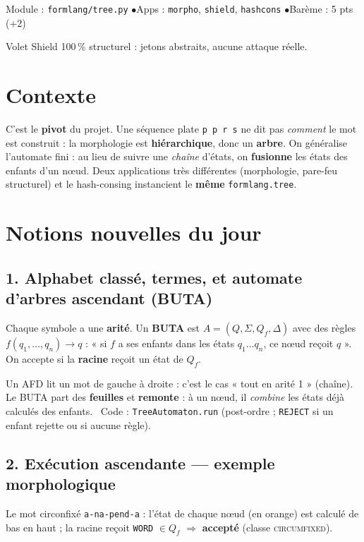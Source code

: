 \documentclass[11pt,a4paper]{scrartcl}
\begin{document}
{Module : \texttt{formlang/tree.py} \quad$\bullet$\quad Apps : \texttt{morpho}, \texttt{shield}, \texttt{hashcons} \quad$\bullet$\quad Barème : 5 pts (+2)}

\begin{ethique}
Volet Shield 100\,\% structurel : jetons abstraits, aucune attaque réelle.
\end{ethique}

\section*{Contexte}
C'est le \textbf{pivot} du projet. Une séquence plate \texttt{p p r s} ne dit pas
\emph{comment} le mot est construit : la morphologie est \textbf{hiérarchique}, donc un
\textbf{arbre}. On généralise l'automate fini : au lieu de suivre une \emph{chaîne}
d'états, on \textbf{fusionne} les états des enfants d'un nœud. Deux applications très
différentes (morphologie, pare-feu structurel) et le hash-consing instancient le
\textbf{même} \texttt{formlang.tree}.

\section*{Notions nouvelles du jour}

\subsection*{1. Alphabet classé, termes, et automate d'arbres ascendant (BUTA)}
Chaque symbole a une \textbf{arité}. Un \textbf{BUTA} est $A=(Q,\Sigma,Q_f,\Delta)$ avec
des règles $f(q_1,\dots,q_n)\to q$ : « si $f$ a ses enfants dans les états $q_1\dots q_n$,
ce nœud reçoit $q$ ». On accepte si la \textbf{racine} reçoit un état de $Q_f$.

\begin{notion}
Un AFD lit un mot de gauche à droite : c'est le cas « tout en arité 1 » (chaîne).
Le BUTA part des \textbf{feuilles} et \textbf{remonte} : à un nœud, il \emph{combine}
les états déjà calculés des enfants. \textbullet\ Code : \texttt{TreeAutomaton.run}
(post-ordre ; \texttt{REJECT} si un enfant rejette ou si aucune règle).
\end{notion}

\subsection*{2. Exécution ascendante — exemple morphologique}
Le mot circonfixé \texttt{a-na-pend-a} : l'état de chaque nœud (en
\textcolor{iutorange!85!black}{orange}) est calculé de bas en haut ; la racine reçoit
\textcolor{iutorange!85!black}{\texttt{WORD}} $\in Q_f$ $\Rightarrow$ \textbf{accepté}
(classe \textsc{circumfixed}).
\end{document}
